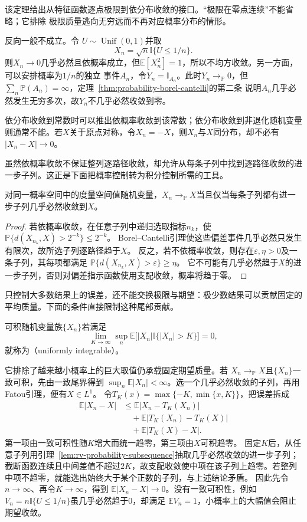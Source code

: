 该定理给出从特征函数逐点极限到依分布收敛的接口。“极限在零点连续”不能省略；它排除
极限质量逃向无穷远而不再对应概率分布的情形。

反向一般不成立。令
\(U\sim\operatorname{Unif}(0,1)\)并取
\[ X_n=\sqrt{n}\mathbb{I}\{U\leq1/n\}. \]
则\(X_n\to0\)几乎必然且依概率成立，但\(\mathbb{E}[X_n^2]=1\)，所以不均方收敛。另一方面，可以安排概率为\(1/n\)的独立
事件\(A_n\)，令\(Y_n=\mathbb{I}_{A_n}\)。此时\(Y_n\to_{\mathbb{P}}0\)，但
\(\sum_n\mathbb{P}(A_n)=\infty\)，定理~\ref{thm:probability-borel-cantelli}的第二条
说明\(A_n\)几乎必然发生无穷多次，故\(Y_n\)不几乎必然收敛到零。

依分布收敛到常数时可以推出依概率收敛到该常数；依分布收敛到非退化随机变量则通常不能。若\(X\)关于原点对称，令\(X_n=-X\)，则\(X_n\)与\(X\)同分布，却不必有\(|X_n-X|\to0\)。

虽然依概率收敛不保证整列逐路径收敛，却允许从每条子列中找到逐路径收敛的进一步子列。这正是下面把概率控制转为积分控制所需的工具。
\begin{lemma}[依概率收敛的子列判据]
 \label{lem:rv-probability-subsequence}
 对同一概率空间中的度量空间值随机变量，\(X_n\to_{\mathbb P}X\)当且仅当每条子列都有进一步子列几乎必然收敛到\(X\)。
\end{lemma}
\begin{proof}
若依概率收敛，在任意子列中递归选取指标\(n_k\)，使
\(\mathbb P\{d(X_{n_k},X)>2^{-k}\}\leq2^{-k}\)。
Borel--Cantelli引理使这些偏差事件几乎必然只发生有限次，故所选子列逐路径趋于\(X\)。
反之，若不依概率收敛，则存在\(\varepsilon,\eta>0\)及一条子列，其每项都满足
\(\mathbb P\{d(X_{n_k},X)>\varepsilon\}\geq\eta\)。
它不可能有几乎必然趋于\(X\)的进一步子列，否则对偏差指示函数使用支配收敛，概率将趋于零。
\end{proof}

只控制大多数结果上的误差，还不能交换极限与期望：极少数结果可以贡献固定的平均质量。下面的条件直接限制这种尾部贡献。
\begin{definition}[一致可积]
  \label{def:probability-uniform-integrability}
可积随机变量族\(\{X_n\}\)若满足
\[
  \lim_{K\to\infty}
  \sup_n\mathbb{E}\bigl[
    |X_n|\mathbb{I}\{|X_n|>K\}
  \bigr]=0,
\]
就称为（uniformly integrable）。
\end{definition}
它排除了越来越小概率上的巨大取值仍承载固定期望质量。若
\(X_n\to_{\mathbb P}X\)且\(\{X_n\}\)一致可积，先由一致尾界得到
\(\sup_n\mathbb E|X_n|<\infty\)。选一个几乎必然收敛的子列，再用Fatou引理，便有\(X\in L^1\)。
令\(T_K(x)=\max\{-K,\min\{x,K\}\}\)，把误差拆成
\[
\begin{aligned}
\mathbb E|X_n-X|
 &\leq\mathbb E|X_n-T_K(X_n)|\\
 &\quad+\mathbb E|T_K(X_n)-T_K(X)|\\
 &\quad+\mathbb E|T_K(X)-X|.
\end{aligned}
\]
第一项由一致可积性随\(K\)增大而统一趋零，第三项由\(X\)可积趋零。
固定\(K\)后，从任意子列用引理~\ref{lem:rv-probability-subsequence}抽取几乎必然收敛的进一步子列；截断函数连续且中间差值不超过\(2K\)，故支配收敛使中项在该子列上趋零。若整列中项不趋零，就能选出始终大于某个正数的子列，与上述结论矛盾。
因此先令\(n\to\infty\)、再令\(K\to\infty\)，得到
\(\mathbb E|X_n-X|\to0\)。没有一致可积性，例如
\(V_n=n\mathbb{I}\{U\leq1/n\}\)虽几乎必然趋于\(0\)，却满足
\(\mathbb{E}V_n=1\)，小概率上的大幅值会阻止期望收敛。

